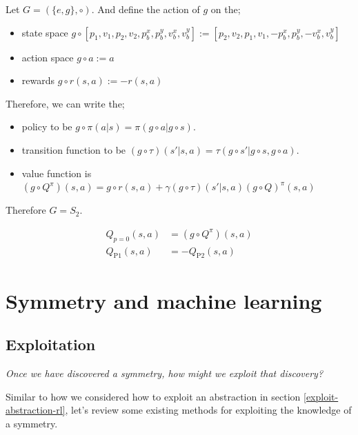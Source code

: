 Let $G = (\{e, g\}, \circ)$. And define the action of $g$ on the;

\begin{itemize}
	\tightlist
	\item state space $g \circ [p_1, v_1, p_2, v_2, p^x_b, p^y_b, v^x_b, v^y_b] := [p_2, v_2, p_1, v_1, -p^x_b, p^y_b, -v^x_b, v^y_b]$
	\item action space $g \circ a := a$
  \item rewards $g \circ r(s, a) := -r(s, a)$
\end{itemize}

Therefore, we can write the;
\begin{itemize}
  \tightlist
 	\item policy to be $g \circ \pi(a | s) = \pi(g \circ a | g \circ s)$.
	\item transition function to be $(g \circ \tau)(s' | s, a) = \tau(g \circ s'| g \circ s, g \circ a)$.
	\item value function is $(g \circ Q^{\pi})(s, a) = g \circ r(s, a)+ \gamma (g \circ \tau)(s'|s, a) (g \circ Q)^{\pi}(s, a)$
\end{itemize}

Therefore $G = S_2$.

\begin{align*}
Q_{p=0}(s, a) &= (g \circ Q^{\pi})(s, a) \\
Q_{\text{P1}}(s, a) &= -Q_{\text{P2}}(s, a)
\end{align*}

\section{Symmetry and machine learning}

\subsection{Exploitation} \label{symmetric-exploitation}

\begin{displayquote}
\textsl{Once we have discovered a symmetry, how might we exploit that discovery?}
\end{displayquote}

Similar to how we considered how to exploit an abstraction in section \ref{exploit-abstraction-rl},
let's review some existing methods for exploiting the knowledge of a symmetry.



